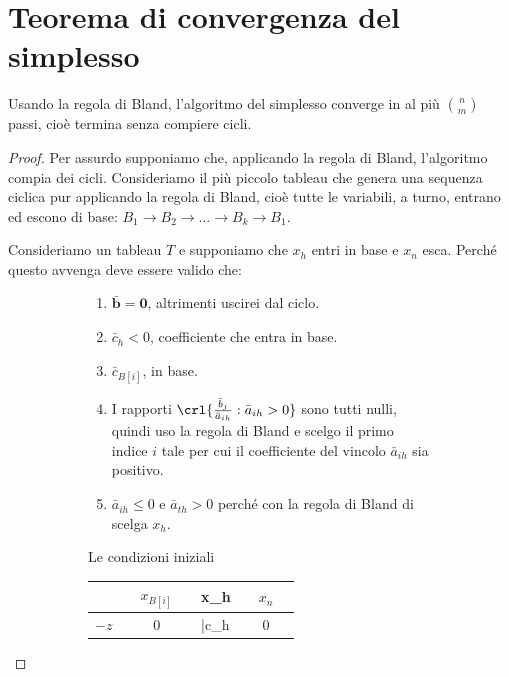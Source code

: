 \documentclass[\main/main.tex]{subfiles}
\begin{document}
\section{Teorema di convergenza del simplesso}

\begin{theorem}
  Usando la regola di Bland, l'algoritmo del simplesso converge in al più $\binom{n}{m}$ passi, cioè termina senza compiere cicli.
\end{theorem}

\begin{proof}
  Per assurdo supponiamo che, applicando la regola di Bland, l'algoritmo compia dei cicli. Consideriamo il più piccolo tableau che genera una sequenza ciclica pur applicando la regola di Bland, cioè tutte le variabili, a turno, entrano ed escono di base: $B_1 \rightarrow B_2 \rightarrow \ldots \rightarrow B_k \rightarrow B_1$.

  Consideriamo un tableau $T$ e supponiamo che $x_h$ entri in base e $x_n$ esca. Perché questo avvenga deve essere valido che:

  \begin{figure}
    \begin{subfigure}{0.49\textwidth}
      \begin{enumerate}
        \item $\bar{\bm{b}} = \bm{0}$, altrimenti uscirei dal ciclo.
        \item $\bar{c}_h < 0$, coefficiente che entra in base.
        \item $\bar{c}_{B[i]}$, in base.
        \item I rapporti $\crl{\frac{\bar{b}_j}{\bar{a}_{ih}}:\bar{a}_{ih}>0}$ sono tutti nulli, quindi uso la regola di Bland e scelgo il primo indice $i$ tale per cui il coefficiente del vincolo $\bar{a}_{ih}$ sia positivo.
        \item $\bar{a}_{ih} \leq 0$ e  $\bar{a}_{th} > 0$ perché con la regola di Bland di scelga $x_h$.
      \end{enumerate}
      \caption{Le condizioni iniziali}
    \end{subfigure}
    \begin{subfigure}{0.49\textwidth}
        \begin{tabular}{c|LcLLLc|L}
                       &  & $x_{B[i]}$ &  & x_h          &  & $x_n$ &   \\
          \hline
          $-z$         &  & 0          &  & \bar{c}_h    &  & 0     &   \\
          \hline


\end{tabular}
\end{subfigure}
\end{figure}
\end{proof}
\end{document}
